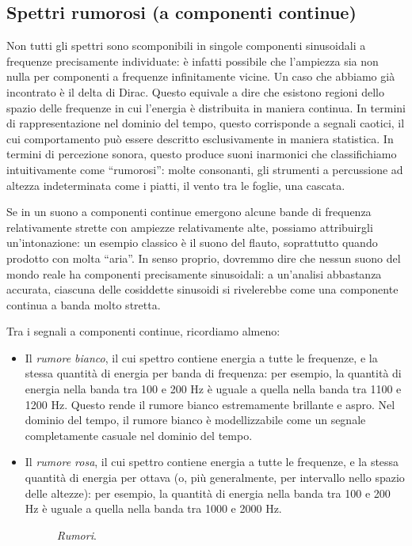 \subsection{Spettri rumorosi (a componenti continue)}

Non tutti gli spettri sono scomponibili in singole componenti sinusoidali a frequenze precisamente individuate: è infatti possibile che l'ampiezza sia non nulla per componenti a frequenze infinitamente vicine. Un caso che abbiamo già incontrato è il delta di Dirac. Questo equivale a dire che esistono regioni dello spazio delle frequenze in cui l'energia è distribuita in maniera continua. In termini di rappresentazione nel dominio del tempo, questo corrisponde a segnali caotici, il cui comportamento può essere descritto esclusivamente in maniera statistica. In termini di percezione sonora, questo produce suoni inarmonici che classifichiamo intuitivamente come ``rumorosi'': molte consonanti, gli strumenti a percussione ad altezza indeterminata come i piatti, il vento tra le foglie, una cascata.

Se in un suono a componenti continue emergono alcune bande di frequenza relativamente strette con ampiezze relativamente alte, possiamo attribuirgli un'intonazione: un esempio classico è il suono del flauto, soprattutto quando prodotto con molta ``aria''. In senso proprio, dovremmo dire che nessun suono del mondo reale ha componenti precisamente sinusoidali: a un'analisi abbastanza accurata, ciascuna delle cosiddette sinusoidi si rivelerebbe come una componente continua a banda molto stretta.

Tra i segnali a componenti continue, ricordiamo almeno:

\begin{itemize}

\item Il \emph{rumore bianco}, il cui spettro contiene energia a tutte le frequenze, e la stessa quantità di energia per banda di frequenza: per esempio, la quantità di energia nella banda tra 100 e 200 Hz è uguale a quella nella banda tra 1100 e 1200 Hz. Questo rende il rumore bianco estremamente brillante e aspro. Nel dominio del tempo, il rumore bianco è modellizzabile come un segnale completamente casuale nel dominio del tempo.

\item Il \emph{rumore rosa}, il cui spettro contiene energia a tutte le frequenze, e la stessa quantità di energia per ottava (o, più generalmente, per intervallo nello spazio delle altezze): per esempio, la quantità di energia nella banda tra 100 e 200 Hz è uguale a quella nella banda tra 1000 e 2000 Hz. 

\begin{figure}
    \begin{center}
       \scalebox{0.6} {}
    \end{center}
    \caption{\emph{Rumori}.}
\end{figure}

\end{itemize}



